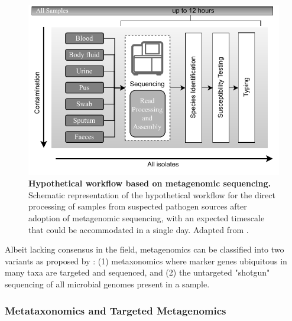 \begin{figure}[h!]
\centering
\includegraphics[width=\textwidth]{figures/introduction/Figure 4.pdf}
\caption{\textbf{Hypothetical workflow based on metagenomic sequencing.} Schematic representation of the hypothetical workflow for the direct processing of samples from suspected pathogen sources after adoption of metagenomic sequencing, with an expected timescale that could be accommodated in a single day. Adapted from \cite{didelot_transforming_2012}.}
\label{fig:figure4}
\end{figure}


Albeit lacking consensus in the field, metagenomics can be classified into two variants as proposed by \citep{marchesi_vocabulary_2015}: (1) metaxonomics where marker genes ubiquitous in many taxa are targeted and sequenced, and (2) the untargeted "shotgun" sequencing of all microbial genomes present in a sample. 

\subsubsection{Metataxonomics and Targeted Metagenomics} \label{sssec:_intro_metataxonomics}

